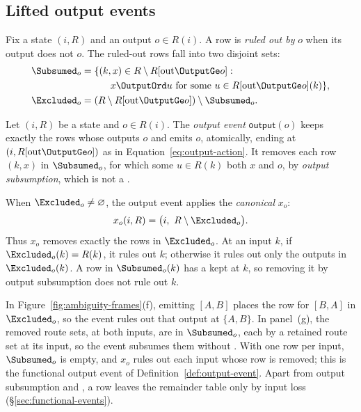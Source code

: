 \subsection{Lifted output events}
\label{app:lifted-output-events}

Fix a state $(i,R)$ and an output $o\in R(i)$.  A row is \emph{ruled out by}
$o$ when its output does not \outrelbase $o$.  The ruled-out rows fall into two
disjoint sets:
\begin{align}
  \Subsumed_o&=\{(k,x)\in R\setminus R[\mathrm{out}\OutputGe o]:\notag\\
    &\qquad\quad x\OutputOrd u\text{ for some }u\in R[\mathrm{out}\OutputGe o](k)\},
      \label{eq:output-subsumptions}\\
  \Excluded_o&=(R\setminus R[\mathrm{out}\OutputGe o])\setminus\Subsumed_o.
      \label{eq:commitment-removals}
\end{align}

\begin{definition}
\label{def:lifted-output-event}
Let $(i,R)$ be a state and $o\in R(i)$.  The \emph{output event}
$\mathsf{output}(o)$ keeps exactly the rows whose outputs \outrelbase $o$ and
emits $o$, atomically, ending at $(i,R[\mathrm{out}\OutputGe o])$ as in
Equation~\ref{eq:output-action}.  It removes each row $(k,x)$ in
$\Subsumed_o$, for which some $u\in R(k)$ \outrel both $x$ and $o$, by
\emph{output subsumption}, which is not a \commitment.
\end{definition}

\begin{definition}
\label{def:canonical-commitment}
When $\Excluded_o\neq\varnothing$, the output event applies the \emph{canonical
\commitment} $x_o$:
\begin{equation}
  x_o(i,R)=\bigl(i,\ R\setminus\Excluded_o\bigr).
  \label{eq:canonical-commitment-relational}
\end{equation}
  Thus $x_o$ removes exactly the rows in $\Excluded_o$.  At an input $k$, if
  $\Excluded_o(k)=R(k)$, it rules out $k$; otherwise it rules out only the
  outputs in $\Excluded_o(k)$.  A row in $\Subsumed_o(k)$ has a kept \outnoun
  at $k$, so removing it by output subsumption does not rule out $k$.
\end{definition}

In Figure~\ref{fig:ambiguity-frames}(f), emitting $[A,B]$ places the row for
$[B,A]$ in $\Excluded_o$, so the event rules out that output at $\{A,B\}$.
In panel~(g), the removed route sets, at both inputs, are in $\Subsumed_o$,
each \outrelpast by a retained route set at its input, so the event subsumes them without
\commitment.  With one row per input, $\Subsumed_o$ is empty, and $x_o$ rules
out each input whose row is removed; this is the functional output event of
Definition~\ref{def:output-event}.  Apart from output subsumption and
\commitments, a row leaves the remainder table only by input loss
(\S\ref{sec:functional-events}).


